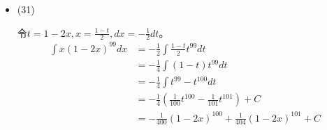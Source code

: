 \documentclass{article}
\begin{document}
\begin{itemize}
        令$t = \sqrt{x + 1}, x = t^2 - 1, dx = 2t dt$。
        \begin{align*}
          \int \frac{\sqrt{x + 1} - 1}{\sqrt{x + 1} + 1} dx
           & = \int \frac{t - 1}{t + 1} 2t dt   \\
           & = 2 \int \frac{(t - 1)t}{t + 1} dt
        \end{align*}
        \begin{zremark}
          我们有$t + a$，使得
          \begin{align*}
            (t + 1)(t + a) + b     & = (t - 1)t \\
            t^2 + at + t + a + b   & = t^2 - t  \\
            t^2 + (a + 1)t + a + b & = t^2 - t
          \end{align*}
          于是
          \begin{equation*}
            \begin{cases}
              a + 1 = -1 \\
              a + b = 0
            \end{cases}
          \end{equation*}
          可得
          \begin{align*}
            a = -2, b = 2
          \end{align*}

          于是
          \begin{align*}
            (t + 1)(t - 2) + 2 & = (t - 1)t
          \end{align*}
        \end{zremark}
        所以
        \begin{align*}
          2 \int \frac{(t - 1)t}{t + 1} dt
           & = 2 \int \frac{(t + 1)(t - 2) + 2}{t + 1} dt  \\
           & = 2 \int t - 2 + \frac{2}{t + 1} dt           \\
           & = 2 (\frac{1}{2}t^2 - 2t + 2 \ln |t + 1|) + C \\
           & = t^2 - 4t + 4 \ln |t + 1| + C
        \end{align*}
        剩下的部分，略

  \item (31)

        令$t = 1 - 2x, x = \frac{1 - t}{2}, dx = -\frac{1}{2} dt$。
        \begin{align*}
          \int x(1 - 2x)^{99} dx
           & = -\frac{1}{2} \int \frac{1 - t}{2} t^{99} dt                    \\
           & = -\frac{1}{4} \int (1 - t) t^{99} dt                            \\
           & = -\frac{1}{4} \int t^{99} - t^{100} dt                          \\
           & = -\frac{1}{4}(\frac{1}{100}t^{100} - \frac{1}{101}t^{101}) + C  \\
           & = -\frac{1}{400}(1 - 2x)^{100} + \frac{1}{404}(1 - 2x)^{101} + C
        \end{align*}


\end{itemize}
\end{document}
